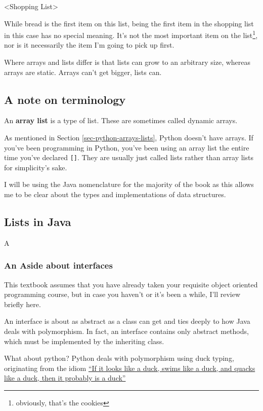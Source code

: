 <Shopping List>

While bread is the first item on this list, being the first item in the shopping list in this case has no special meaning.  It's not the most important item on the list\footnote{obviously, that's the cookies}, nor is it necessarily the item I'm going to pick up first.

Where arrays and lists differ is that lists can grow to an arbitrary size, whereas arrays are static.  Arrays can't get bigger, lists can.

\subsection*{A note on terminology}
An \textbf{array list} is a type of list.  These are sometimes called dynamic arrays.

As mentioned in Section \ref{sec-python-arrays-lists}, Python doesn't have arrays.  If you've been programming in Python, you've been using an array list the entire time you've declared \texttt{[]}.  They are usually just called lists rather than array lists for simplicity's sake.


I will be using the Java nomenclature for the majority of the book as this allows me to be clear about the types and implementations of data structures.

\subsection{Lists in Java}

A

\subsubsection{An Aside about interfaces}
This textbook assumes that you have already taken your requisite object oriented programming course, but in case you haven't or it's been a while, I'll review briefly here.


An interface is about as abstract as a class can get and ties deeply to how Java deals with polymorphism.  In fact, an interface contains only abstract methods, which must be implemented by the inheriting class.


What about python?  Python deals with polymorphism using duck typing, originating from the idiom  \href{https://en.wikipedia.org/wiki/Duck\_test}{``If it looks like a duck, swims like a duck, and quacks like a duck, then it probably is a duck''}
